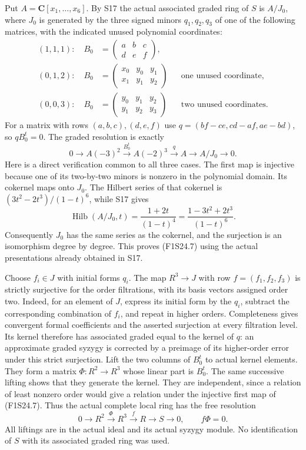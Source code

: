 Put $A=\mathbf C[x_1,\ldots,x_6]$. By S17 the actual associated
graded ring of $S$ is $A/J_0$, where $J_0$ is generated by the
three signed minors $q_1,q_2,q_3$ of one of the following matrices,
with the indicated unused polynomial coordinates:
\[
 \begin{aligned}
 (1,1,1):\quad B_0&=\begin{pmatrix}a&b&c\\d&e&f\end{pmatrix},\\
 (0,1,2):\quad B_0&=\begin{pmatrix}x_0&y_0&y_1\\x_1&y_1&y_2\end{pmatrix}
                  &&\text{one unused coordinate},\\
 (0,0,3):\quad B_0&=\begin{pmatrix}y_0&y_1&y_2\\y_1&y_2&y_3\end{pmatrix}
                  &&\text{two unused coordinates}.
 \end{aligned}
 \tag{F1S24.6}
\]
For a matrix with rows $(a,b,c),(d,e,f)$ use
$q=(bf-ce,cd-af,ae-bd)$, so $q B_0^t=0$.
The graded resolution is exactly
\[
 0\longrightarrow A(-3)^2\xrightarrow{B_0^t}A(-2)^3
       \xrightarrow{q}A\longrightarrow A/J_0\longrightarrow0.
 \tag{F1S24.7}
\]
Here is a direct verification common to all three cases.
The first map is injective because one of its two-by-two minors
is nonzero in the polynomial domain. Its cokernel maps onto
$J_0$. The Hilbert series of that cokernel is
$(3t^2-2t^3)/(1-t)^6$, while S17 gives
\[
 \operatorname{Hilb}(A/J_0,t)=\frac{1+2t}{(1-t)^4}
                       =\frac{1-3t^2+2t^3}{(1-t)^6}.
\]
Consequently $J_0$ has the same series as the cokernel, and the
surjection is an isomorphism degree by degree. This proves
(F1S24.7) using the actual presentations already obtained in S17.

Choose $f_i\in J$ with initial forms $q_i$.
The map $R^3\to J$ with row $f=(f_1,f_2,f_3)$ is strictly
surjective for the order filtrations, with its basis vectors
assigned order two. Indeed, for an element of $J$, express its
initial form by the $q_i$, subtract the corresponding combination
of $f_i$, and repeat in higher orders. Completeness gives convergent
formal coefficients and the asserted surjection at every filtration
level. Its kernel therefore has associated graded equal to the
kernel of $q$: an approximate graded syzygy is corrected by a
preimage of its higher-order error under this strict surjection.
Lift the two columns of $B_0^t$ to actual kernel elements. They
form a matrix $\Phi:R^2\to R^3$ whose linear part is $B_0^t$.
The same successive lifting shows that they generate the kernel.
They are independent, since a relation of least nonzero order
would give a relation under the injective first map of (F1S24.7).
Thus the actual complete local ring has the free resolution
\[
 0\longrightarrow R^2\xrightarrow{\Phi}R^3
     \xrightarrow{f}R\longrightarrow S\longrightarrow0,
       \qquad f\Phi=0.
 \tag{F1S24.8}
\]
All liftings are in the actual ideal and its actual syzygy module.
No identification of $S$ with its associated graded ring was used.

